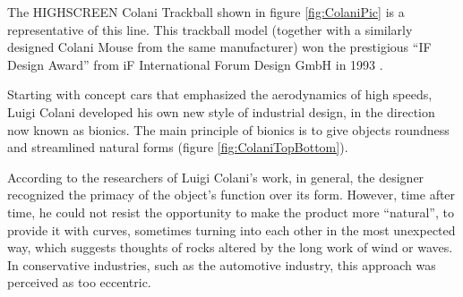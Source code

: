 \documentclass[11pt, a4paper]{article}
\begin{document}
The HIGHSCREEN Colani Trackball shown in figure \ref{fig:ColaniPic} is a representative of this line. This trackball model (together with a similarly designed Colani Mouse from the same manufacturer) won the prestigious “IF Design Award” from iF International Forum Design GmbH in 1993 \cite{award}.

Starting with concept cars that emphasized the aerodynamics of high speeds, Luigi Colani developed his own new style of industrial design, in the direction now known as bionics. The main principle of bionics is to give objects roundness and streamlined natural forms (figure \ref{fig:ColaniTopBottom}).

{According to the researchers of Luigi Colani's work, in general, the designer recognized the primacy of the object's function over its form. However, time after time, he could not resist the opportunity to make the product more “natural”, to provide it with curves, sometimes turning into each other in the most unexpected way, which suggests thoughts of rocks altered by the long work of wind or waves. In conservative industries, such as the automotive industry, this approach was perceived as too eccentric.}

~
\end{document}

